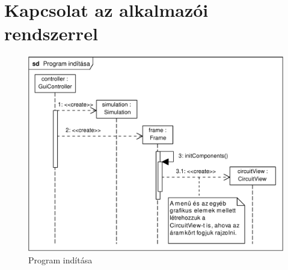 \section{Kapcsolat az alkalmazói rendszerrel}

\begin{figure}[H]
\begin{center}
\includegraphics[width=17cm]{chapters/chapter11/pdfs/1_program_start.pdf}
\caption{Program indítása}
\label{fig:program_start}
\end{center}
\end{figure}

